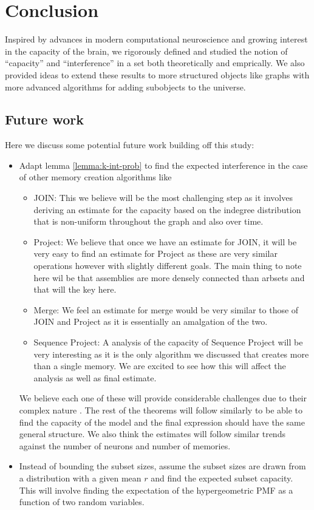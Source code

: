 \chapter{Conclusion}

Inspired by advances in modern computational neuroscience and growing interest in the capacity of the brain, we rigorously defined and studied the notion of ``capacity'' and ``interference'' in a set both theoretically and emprically. We also provided ideas to extend these results to more structured objects like graphs with more advanced algorithms for adding subobjects to the universe.

\section{Future work}

Here we discuss some potential future work building off this study:

\begin{itemize}
    \item Adapt lemma \ref{lemma:k-int-prob} to find the expected interference in the case of other memory creation algorithms like \begin{itemize}
        \item JOIN: This we believe will be the most challenging step as it involves deriving an estimate for the capacity based on the indegree distribution that is non-uniform throughout the graph and also over time. 
        \item Project: We believe that once we have an estimate for JOIN, it will be very easy to find an estimate for Project as these are very similar operations however with slightly different goals. The main thing to note here wil be that assemblies are more densely connected than arbsets and that will the key here. 
        \item Merge: We feel an estimate for merge would be very similar to those of JOIN and Project as it is essentially an amalgation of the two. 
        \item Sequence Project: A analysis of the capacity of Sequence Project will be very interesting as it is the only algorithm we discussed that creates more than a single memory. We are excited to see how this will affect the analysis as well as final estimate. 
    \end{itemize}
    We believe each one of these will provide considerable challenges due to their complex nature \cite{dabagia2023computation, papadimitriou2020brain,valiant2005memorization}. The rest of the theorems will follow similarly to be able to find the capacity of the model and the final expression should have the same general structure. We also think the estimates will follow similar trends against the number of neurons and number of memories. 
    \item Instead of bounding the subset sizes, assume the subset sizes are drawn from a distribution with a given mean $r$ and find the expected subset capacity. This will involve finding the expectation of the hypergeometric PMF as a function of two random variables. 
\end{itemize}

